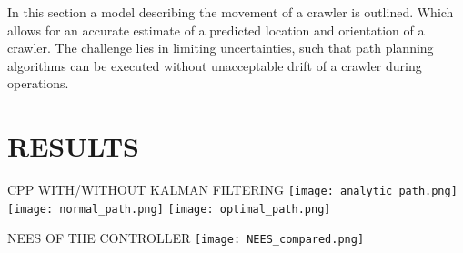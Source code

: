 In this section a model describing the movement of a crawler is outlined. Which allows for an accurate estimate of a
predicted location and orientation of a crawler. The challenge lies in limiting uncertainties, such that path
planning algorithms can be executed without unacceptable drift of a crawler during operations.


\section{RESULTS}\label{sec:results}


\begin{RoyalFigure}[!htb, label=fig:coverage_wo_kalman]{CPP WITH/WITHOUT KALMAN FILTERING}
	\center
	\texttt{[image: analytic\_path.png]}
	\texttt{[image: normal\_path.png]}
	\texttt{[image: optimal\_path.png]}
\end{RoyalFigure}

\begin{RoyalFigure}[!htb, label=fig:NEES_kalman]{NEES OF THE CONTROLLER}
	\texttt{[image: NEES\_compared.png]}
\end{RoyalFigure}
